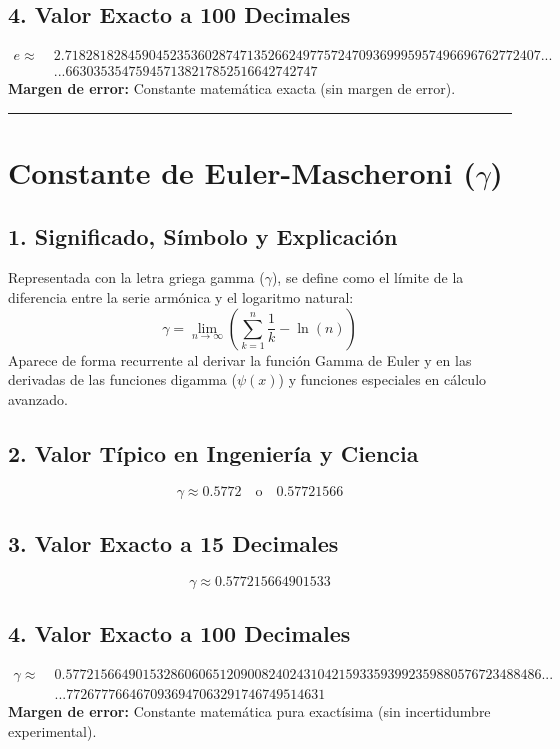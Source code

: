 \documentclass[12pt,a4paper]{article}
\begin{document}
\subsection*{4. Valor Exacto a 100 Decimales}
\begin{align*}
e \approx \; & 2.71828182845904523536028747135266249775724709369995957496696762772407... \\
& ...663035354759457138217852516642742747
\end{align*}
\textbf{Margen de error:} Constante matemática exacta (sin margen de error).

\vspace{0.8cm}
\hrule
\vspace{0.8cm}

\section{Constante de Euler-Mascheroni ($\gamma$)}

\subsection*{1. Significado, Símbolo y Explicación}
Representada con la letra griega gamma ($\gamma$), se define como el límite de la diferencia entre la serie armónica y el logaritmo natural:
\begin{equation*}
\gamma = \lim_{n \to \infty} \left( \sum_{k=1}^{n} \frac{1}{k} - \ln(n) \right)
\end{equation*}
Aparece de forma recurrente al derivar la función Gamma de Euler y en las derivadas de las funciones digamma ($\psi(x)$) y funciones especiales en cálculo avanzado.

\subsection*{2. Valor Típico en Ingeniería y Ciencia}
\begin{equation*}
\gamma \approx 0.5772 \quad \text{o} \quad 0.57721566
\end{equation*}

\subsection*{3. Valor Exacto a 15 Decimales}
\begin{equation*}
\gamma \approx 0.577215664901533
\end{equation*}

\subsection*{4. Valor Exacto a 100 Decimales}
\begin{align*}
\gamma \approx \; & 0.57721566490153286060651209008240243104215933593992359880576723488486... \\
& ...7726777664670936947063291746749514631
\end{align*}
\textbf{Margen de error:} Constante matemática pura exactísima (sin incertidumbre experimental).
\end{document}
